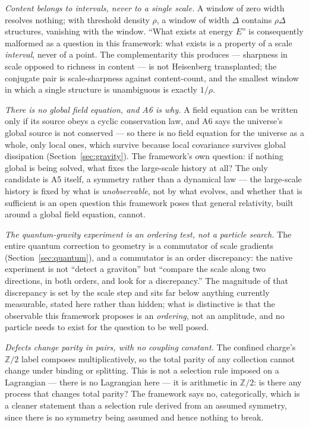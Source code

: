 \documentclass[aps,prd,twocolumn,superscriptaddress,nofootinbib]{revtex4-2}
\begin{document}
\emph{Content belongs to intervals, never to a single scale.} A window
of zero width resolves nothing; with threshold density $\rho$, a window
of width $\Delta$ contains $\rho\Delta$ structures, vanishing with the
window. ``What exists at energy $E$'' is consequently malformed as a
question in this framework: what exists is a property of a scale
\emph{interval}, never of a point. The complementarity this produces —
sharpness in scale opposed to richness in content — is not Heisenberg
transplanted; the conjugate pair is scale-sharpness against
content-count, and the smallest window in which a single structure is
unambiguous is exactly $1/\rho$.

\emph{There is no global field equation, and A6 is why.} A field
equation can be written only if its source obeys a cyclic conservation
law, and A6 says the universe's global source is not conserved — so
there is no field equation for the universe as a whole, only local ones,
which survive because local covariance survives global dissipation
(Section~\ref{sec:gravity}). The framework's own question: if nothing
global is being solved, what fixes the large-scale history at all? The
only candidate is A5 itself, a symmetry rather than a dynamical law —
the large-scale history is fixed by what is \emph{unobservable}, not by
what evolves, and whether that is sufficient is an open question this
framework poses that general relativity, built around a global field
equation, cannot.

\emph{The quantum-gravity experiment is an ordering test, not a
particle search.} The entire quantum correction to geometry is a
commutator of scale gradients (Section~\ref{sec:quantum}), and a
commutator is an order discrepancy: the native experiment is not
``detect a graviton'' but ``compare the scale along two directions, in
both orders, and look for a discrepancy.'' The magnitude of that
discrepancy is set by the scale step and sits far below anything
currently measurable, stated here rather than hidden; what is
distinctive is that the observable this framework proposes is an
\emph{ordering}, not an amplitude, and no particle needs to exist for
the question to be well posed.

\emph{Defects change parity in pairs, with no coupling constant.} The
confined charge's $\mathbb{Z}/2$ label composes multiplicatively, so the
total parity of any collection cannot change under binding or splitting.
This is not a selection rule imposed on a Lagrangian — there is no
Lagrangian here — it is arithmetic in $\mathbb{Z}/2$: is there any
process that changes total parity? The framework says no, categorically,
which is a cleaner statement than a selection rule derived from an
assumed symmetry, since there is no symmetry being assumed and hence
nothing to break.
\end{document}
